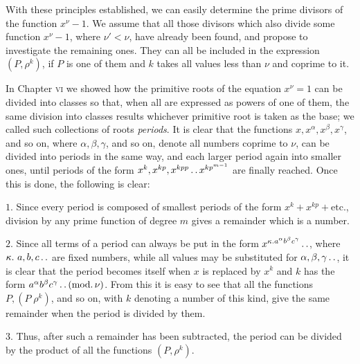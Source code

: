 \clearpage
{}
With these principles established, we can easily determine the prime divisors of the function $x^\nu-1$. We assume that all those divisors which also divide some function
$x^\nu-1$, where $\nu'<\nu$, have already been found, and propose to investigate the remaining ones. They can all be included in the expression $(P,\rho^k)$, if $P$ is one of them and $k$ takes all values less than $\nu$ and coprime to it.

In Chapter \textsc{vi} we showed how the primitive roots of the equation $x^\nu=1$ can be divided into classes so that, when all are expressed as powers of one of them, the same division into classes results whichever primitive root is taken as the base; we called such collections of roots \emph{periods}. It is clear that the functions $x,x^\alpha,x^\beta,x^\gamma$, and so on, where $\alpha,\beta,\gamma$, and so on, denote all numbers coprime to $\nu$, can be divided into periods in the same way, and each larger period again into smaller ones, until periods of the form $x^k,x^{kp},x^{kpp}\mathinner{.\,.} x^{kp^{m-1}}$ are finally reached. Once this is done, the following is clear:

$1$. Since every period is composed of smallest periods of the form $x^k+x^{kp}+\text{etc.}$, division by any prime function of degree $m$ gives a remainder which is a number.

$2$. Since all terms of a period can always be put in the form $x^{\kappa\mathbin{.} a^\alpha b^\beta c^\gamma}\mathinner{.\,.}$, where $\kappa.\ a,b,c\dotstwo$ are fixed numbers, while all values may be substituted for $\alpha,\beta,\gamma\mathinner{.\,.}$, it is clear that the period becomes itself when $x$ is replaced by $x^k$ and $k$ has the form $a^\alpha b^\beta c^\gamma\mathinner{.\,.}(\mathrm{mod.}\,\nu)$. From this it is easy to see that all the functions $P,(P\;\rho^k)$, and so on, with $k$ denoting a number of this kind, give the same remainder when the period is divided by them.

$3$. Thus, after such a remainder has been subtracted, the period can be divided by the product of all the functions $(P,\rho^k)$.

